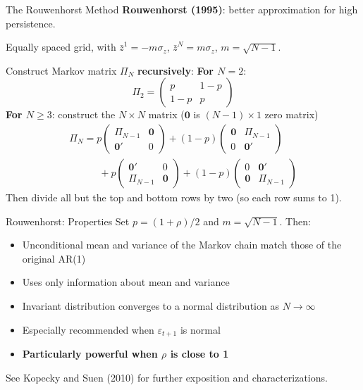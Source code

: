 \documentclass[blue]{beamer}
\begin{document}
\begin{frame}{The Rouwenhorst Method}
	\textbf{Rouwenhorst (1995)}: better approximation for high persistence.

	Equally spaced grid, with $\bar{z}^1 = -m \sigma_z$, $\bar{z}^N = m \sigma_z$, $m = \sqrt{N-1}$.

	Construct Markov matrix $\Pi_N$ \textbf{recursively}:
	\textbf{For $N = 2$}:
	\[
	\Pi_2 = \begin{pmatrix} p & 1-p \\ 1-p & p \end{pmatrix}
	\]
	\medskip
	\textbf{For $N \geq 3$}: construct the $N \times N$ matrix ($\mathbf{0}$ is $(N-1)\times 1$ zero matrix)
	\[
	\begin{array}{l}
    \Pi_N = p \begin{pmatrix} \Pi_{N-1} & \mathbf{0} \\ \mathbf{0'} & 0 \end{pmatrix} + (1-p) \begin{pmatrix} \mathbf{0} & \Pi_{N-1} \\ 0 & \mathbf{0'} \end{pmatrix} \\
    \quad\quad \quad+ p \begin{pmatrix} \mathbf{0'} & 0 \\ \Pi_{N-1} & \mathbf{0} \end{pmatrix} + (1-p) \begin{pmatrix} 0 & \mathbf{0'} \\ \mathbf{0} & \Pi_{N-1} \end{pmatrix}
    \end{array}
	\]
	Then divide all but the top and bottom rows by two (so each row sums to 1).
\end{frame}

\begin{frame}{Rouwenhorst: Properties}
	Set $p = (1 + \rho)/2$ and $m = \sqrt{N - 1}$. Then:
	
	\begin{itemize}
		\item Unconditional mean and variance of the Markov chain match those of the original AR(1)
		\item Uses only information about mean and variance
		\item Invariant distribution converges to a normal distribution as $N \to \infty$
		\item Especially recommended when $\varepsilon_{t+1}$ is normal
		\item \textbf{Particularly powerful when $\rho$ is close to 1}
	\end{itemize}
	
	\bigskip
	See Kopecky and Suen (2010) for further exposition and characterizations.
\end{frame}
\end{document}
